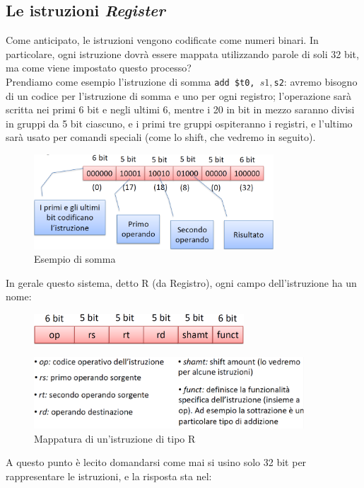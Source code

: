 \documentclass[class=book, crop=false]{standalone}
\begin{document}
\subsection{Le istruzioni \emph{Register}}
Come anticipato, le istruzioni vengono codificate come numeri binari. In particolare, ogni istruzione dovrà essere mappata utilizzando parole di soli 32 bit, ma come viene impostato questo processo?\\
Prendiamo come esempio l'istruzione di somma \texttt{add \$t0, $s1, $s2}: avremo bisogno di un codice per l'istruzione di somma e uno per ogni registro; l'operazione sarà scritta nei primi 6 bit e negli ultimi 6, mentre i 20 in bit in mezzo saranno divisi in gruppi da 5 bit ciascuno, e i primi tre gruppi ospiteranno i registri, e l'ultimo sarà usato per comandi speciali (come lo shift, che vedremo in seguito).
\begin{figure}[H]
	\centering
	\includegraphics[width=0.8\textwidth,keepaspectratio]{istruzioni.png}
	\caption{Esempio di somma}
\end{figure}
In gerale questo sistema, detto R (da Registro), ogni campo dell'istruzione ha un nome:
\begin{figure}[H]
	\centering
	\includegraphics[width=0.7\textwidth,keepaspectratio]{mappatura.png}
\end{figure}
\begin{figure}[H]
	\centering
	\includegraphics[width=0.9\textwidth,keepaspectratio]{desc_map.png}
	\caption{Mappatura di un'istruzione di tipo R}
\end{figure}
A questo punto è lecito domandarsi come mai si usino solo 32 bit per rappresentare le istruzioni, e la risposta sta nel:
\end{document}
